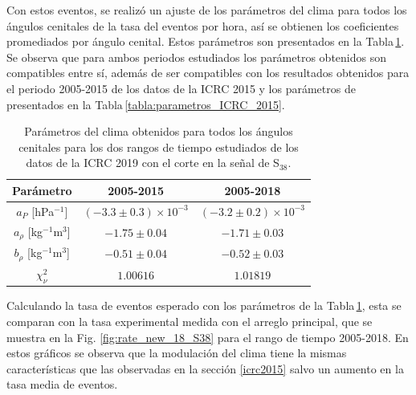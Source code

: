    Con estos eventos, se realizó un  ajuste de los parámetros del clima para todos los ángulos cenitales de la tasa del eventos por hora, así se obtienen los coeficientes promediados por ángulo cenital. Estos parámetros son presentados en la Tabla\,\ref{tabla:parametros_ICRC_2019_S38}. Se observa que para ambos periodos estudiados los parámetros obtenidos son compatibles entre sí, además de ser compatibles con los resultados obtenidos para el periodo 2005-2015 de los datos de la ICRC 2015 y los parámetros de \cite{aab2017impact} presentados en la Tabla\,\ref{tabla:parametros_ICRC_2015}.

   \begin{table}[H]
       \centering
       \begin{tabular}{c|c|c}
       {Parámetro}                 & {2005-2015}    		        & {2005-2018}    \\ \hline \hline
       $a_P$ [hPa$^{-1}$]          & $ (-3.3\pm 0.3)\times 10^{-3}$& $(-3.2\pm 0.2)\times 10^{-3}$  \\ \hline
       $a_\rho$ [kg$^{-1}$m$^3$]   & $ -1.75\pm 0.04$            	& $ -1.71\pm 0.03$       \\ \hline
       $b_\rho$ [kg$^{-1}$m$^3$]   & $ -0.51\pm 0.04$             	& $ -0.52\pm 0.03$       \\ \hline
       $\chi^2_\nu$                & $1.00616$                     & $1.01819$              \\   
       \end{tabular} 
       \caption{Parámetros del clima obtenidos para todos los ángulos cenitales para los dos rangos de tiempo estudiados de los datos de la ICRC 2019 con el corte en la señal de S$_{38}$.} \label{tabla:parametros_ICRC_2019_S38}
   \end{table}
   
   Calculando la tasa de eventos esperado con los parámetros de la Tabla\,\ref{tabla:parametros_ICRC_2019_S38}, esta se comparan con la tasa experimental medida con el arreglo principal, que se muestra en la Fig. \ref{fig:rate_new_18_S38} para el rango de tiempo 2005-2018. En estos gráficos se observa que la modulación del clima tiene la mismas características que las observadas en la sección \ref{icrc2015} salvo un aumento en la tasa media de eventos.

